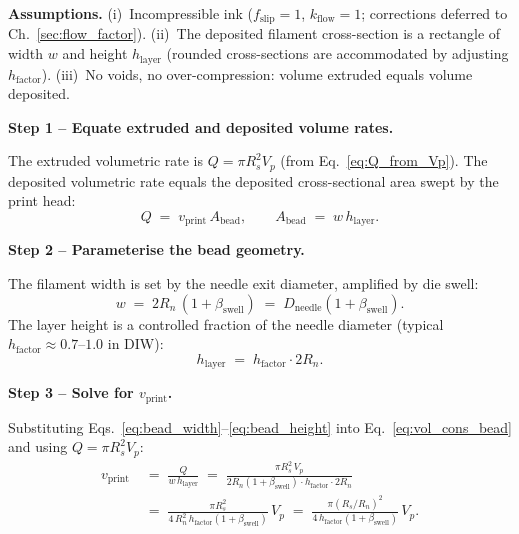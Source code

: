 \documentclass[11pt,a4paper]{article}
\begin{document}
\begin{derivationbox}[title={DERIVATION --- Volume conservation: $V_p\to v_\mathrm{print}$}]
\textbf{Assumptions.}
(i)~Incompressible ink ($f_\mathrm{slip}=1$, $k_\mathrm{flow}=1$;
corrections deferred to Ch.~\ref{sec:flow_factor}).
(ii)~The deposited filament cross-section is a rectangle of width $w$ and
height $h_\mathrm{layer}$ (rounded cross-sections are accommodated by
adjusting $h_\mathrm{factor}$).
(iii)~No voids, no over-compression: volume extruded equals volume
deposited.

\medskip\noindent\textbf{Step 1 -- Equate extruded and deposited volume
rates.}

The extruded volumetric rate is $Q = \pi R_s^2 V_p$ (from
Eq.~\ref{eq:Q_from_Vp}).
The deposited volumetric rate equals the deposited cross-sectional area
swept by the print head:
\begin{equation}
Q \;=\; v_\mathrm{print}\,A_\mathrm{bead}, \qquad
A_\mathrm{bead} \;=\; w\,h_\mathrm{layer}.
\label{eq:vol_cons_bead}
\end{equation}

\noindent\textbf{Step 2 -- Parameterise the bead geometry.}

The filament width is set by the needle exit diameter, amplified by die
swell:
\begin{equation}
w \;=\; 2R_n\,(1+\beta_\mathrm{swell}) \;=\; D_\mathrm{needle}(1+\beta_\mathrm{swell}).
\label{eq:bead_width}
\end{equation}
The layer height is a controlled fraction of the needle diameter (typical
$h_\mathrm{factor}\approx 0.7$--$1.0$ in DIW):
\begin{equation}
h_\mathrm{layer} \;=\; h_\mathrm{factor}\cdot 2R_n.
\label{eq:bead_height}
\end{equation}

\noindent\textbf{Step 3 -- Solve for $v_\mathrm{print}$.}

Substituting Eqs.~\ref{eq:bead_width}--\ref{eq:bead_height} into
Eq.~\ref{eq:vol_cons_bead} and using $Q=\pi R_s^2 V_p$:
\begin{align}
v_\mathrm{print}
  &\;=\; \frac{Q}{w\,h_\mathrm{layer}}
   \;=\; \frac{\pi R_s^2\,V_p}
              {2R_n(1+\beta_\mathrm{swell})\cdot h_\mathrm{factor}\cdot 2R_n}
\nonumber\\[4pt]
  &\;=\; \frac{\pi R_s^2}
              {4\,R_n^2\,h_\mathrm{factor}(1+\beta_\mathrm{swell})}\,V_p
   \;=\; \frac{\pi (R_s/R_n)^2}
              {4\,h_\mathrm{factor}(1+\beta_\mathrm{swell})}\,V_p.
\label{eq:vprint_derived}
\end{align}


\end{derivationbox}
\end{document}

